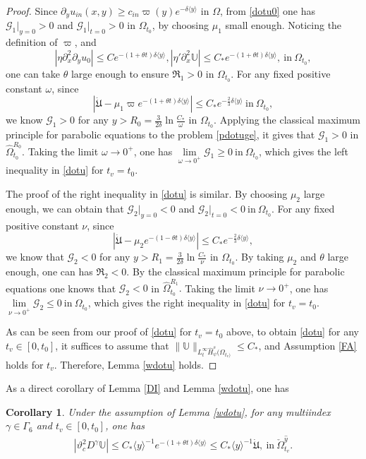 \documentclass{amsart}
\numberwithin{equation}{section}
\newtheorem{corollary}{Corollary}[section]
\newcommand\y{{{\langle y \rangle}}}
\begin{document}
\begin{proof}
Since $\partial_{y}u_{in}(x,y)\geq c_{in}\varpi(y)e^{-\delta\y}$ in $\Omega$, from \eqref{dotu0} one has $\mathcal{G}_{1}|_{y=0}>0$ and $\mathcal{G}_{1}|_{t=0}>0$ in $\Omega_{t_{0}}$, by choosing $\mu_{1}$ small enough. Noticing the definition of $\varpi$, and
$$|\eta\partial_{x}^{2}\partial_{y}u_{0}|\leq Ce^{-(1+\theta t)\delta\y},
|\eta'\partial_{x}^{2}\mathbb{U}|\leq C_{*}e^{-(1+\theta t)\delta\y},~\text{in}~\Omega_{t_{0}},$$
one can take $\theta$ large enough to ensure $\mathfrak{R}_{1}>0$ in $\Omega_{t_{0}}$.
For any fixed positive constant $\omega$, since
$$|\dot{\mathfrak{U}}-\mu_{1}\varpi e^{-(1+\theta t)\delta\y}|\leq C_{*}e^{-\frac{2}{3}\delta\y}~\text{in}~\Omega_{t_{0}},$$
we know $\mathcal{G}_{1}>0$ for any $y>R_{0}=\frac{3}{2\delta}\ln{\frac{C_{*}}{\omega}}$ in $\Omega_{t_{0}}$.
Applying the classical maximum principle for parabolic equations to the problem \eqref{pdotuge}, it gives that
$\mathcal{G}_{1}>0$ in $\hat{\Omega}_{t_{0}}^{R_{0}}$.
Taking the limit $\omega\to 0^{+}$, one has $\lim\limits_{\omega\to 0^{+}}\mathcal{G}_{1}\geq 0 ~\text{in}~\Omega_{t_{0}}$, which gives the left inequality in \eqref{dotu} for $t_{v}=t_{0}$.

The proof of the right inequality in \eqref{dotu} is similar.
By choosing $\mu_{2}$ large enough, we can obtain that
$\mathcal{G}_{2}|_{y=0}<0$ and $\mathcal{G}_{2}|_{t=0}<0 ~\text{in}~\Omega_{t_{0}}.$
For any fixed positive constant $\nu$, since
$$|\dot{\mathfrak{U}}-\mu_{2}e^{-(1-\theta t)\delta\y}|\leq C_{*}e^{-\frac{2}{3}\delta\y},$$
we know that $\mathcal{G}_{2}<0$ for any $y>R_{1}=\frac{3}{2\delta}\ln{\frac{C_{*}}{\nu}}$ in $\Omega_{t_{0}}$.
By taking $\mu_{2}$ and $\theta$ large enough, one can has $\mathfrak{R}_{2}<0$.
By the classical maximum principle for parabolic equations one knows that $\mathcal{G}_{2}<0$ in $\hat{\Omega}_{t_{0}}^{R_{1}}.$
Taking the limit $\nu\to 0^{+}$, one has $\lim\limits_{\nu\to0^{+}}\mathcal{G}_{2}\leq0 ~\text{in}~\Omega_{t_{0}}$, which gives the right inequality in \eqref{dotu}  for $t_{v}=t_{0}$.

As can be seen from our proof of \eqref{dotu} for $t_{v}=t_{0}$ above,  to obtain \eqref{dotu} for any $t_{v}\in[0,t_{0}]$, it suffices to assume that $\|\mathbb{U}\|_{L_{t}^{\infty}\hat{H}_{\psi}^{s}(\Omega_{t_{v})}}\leq C_{*}$,
and Assumption \ref{FA} holds for $t_{v}$. Therefore, Lemma \ref{wdotu} holds.
\end{proof}

As a direct corollary of Lemma \ref{DI} and Lemma \ref{wdotu}, one has
\begin{corollary}\label{wdotuC'}
Under the assumption of Lemma \ref{wdotu}, for any multiindex $\gamma\in\Gamma_{6}$ and $t_{v}\in[0,t_{0}]$, one has
\begin{align*}
|\vartheta_{c}^{2}D^{\gamma}\mathbb{U}|
\leq C_{*}\y^{-1}e^{-(1+\theta t)\delta\y}
\leq C_{*}\y^{-1}\dot{\mathfrak{U}},~\text{in}~\check{\Omega}_{t_{v}}^{\hat{y}}.
\end{align*}
\end{corollary}
\end{document}
